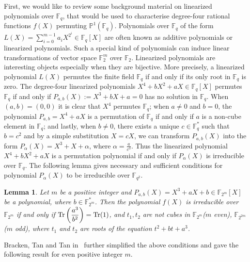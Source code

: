 \documentclass[12pt]{amsart}
\newtheorem{lem}[thm]{Lemma}
\numberwithin{equation}{section}
\theoremstyle{definition}
\newcommand{\F}{\mathbb F}
\newcommand{\bP}{\mathbb P}
\def\Tr{{\rm Tr}}
\begin{document}
First, we would like to review some background material on linearized polynomials over  $\F_{q}$, that would be used to characterise degree-four rational functions $f(X)$ permuting $\bP^1(\F_{q})$.
Polynomials over $\F_q$ of the form $ L(X)=\sum_{i=0}^{m-1} a_iX^{2^i} \in \F_q[X]$ are often known as additive polynomials or linearized polynomials. Such a special kind of polynomials can induce linear transformations of vector space $\F_2^m$ over $\F_2$. Linearized polynomials are interesting objects especially when they are bijective. More precisely, a linearized polynomial $L(X)$ permutes the finite field $\F_q$ if and only if its only root in $\F_q$ is zero. 
The degree-four linearized polynomials $X^4+bX^2+aX \in \F_q[X]$ permutes $\F_q$ if and only if $P_{a,b}(X):=X^3+bX+a=0$ has no solution in $\F_q$. When $(a,b)=(0,0)$ it is clear that $X^4$ permutes $\F_q$; when $a\neq0$ and $b=0$, the polynomial $P_{a,b}=X^4+aX$ is a permutation of $\F_q$ if and only if $a$ is a non-cube element in $\F_q$; and lastly, when $b \neq0$, there exists a unique $c \in \F_q^*$ such that $b=c^2$ and by a simple substitution $X=cX$, we can transform $P_{a,b}(X)$ into the
form $P_{\alpha}(X)=X^3+X+\alpha$, where $\alpha=\frac{a}{c^3}$. Thus the linearized polynomial $X^4+bX^2+aX$ is a permutation polynomial if and only if $P_{\alpha}(X)$ is irreducible over $\F_q$.
The following lemma gives necessary and sufficient conditions for polynomial $P_{\alpha}(X)$ to be irreducible over $\F_{q^2}$.
\begin{lem}\cite{Wil} \label{L49}
Let $m$ be a positive integer and $P_{a,b}(X)=X^3+aX+b\in \F_{2^m}[X]$ be a polynomial, where $b \in \F_{2^m}^{*}$. Then the polynomial $f(X)$ is irreducible over $\F_{2^m}$ if and only if $\Tr\left(\dfrac{a^3}{b^2}\right)=\Tr(1)$, and $t_1, t_2$ are not cubes in $\F_{2^m}$($m$ even), $\F_{2^{2m}}$ ($m$ odd), where $t_1$ and $t_2$ are roots of the equation $t^2+bt+a^3$.
\end{lem}

Bracken, Tan and Tan in~\cite{Bracken_14} further simplified the above conditions and gave the following result for even positive integer $m$.
\end{document}
